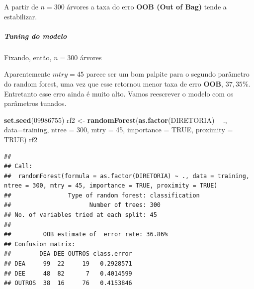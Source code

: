\documentclass[]{article}
\newenvironment{Shaded}{\begin{snugshade}}{\end{snugshade}}
\newcommand{\KeywordTok}[1]{\textcolor[rgb]{0.13,0.29,0.53}{\textbf{#1}}}
\newcommand{\DataTypeTok}[1]{\textcolor[rgb]{0.13,0.29,0.53}{#1}}
\newcommand{\DecValTok}[1]{\textcolor[rgb]{0.00,0.00,0.81}{#1}}
\newcommand{\StringTok}[1]{\textcolor[rgb]{0.31,0.60,0.02}{#1}}
\newcommand{\CommentTok}[1]{\textcolor[rgb]{0.56,0.35,0.01}{\textit{#1}}}
\newcommand{\OtherTok}[1]{\textcolor[rgb]{0.56,0.35,0.01}{#1}}
\newcommand{\OperatorTok}[1]{\textcolor[rgb]{0.81,0.36,0.00}{\textbf{#1}}}
\newcommand{\NormalTok}[1]{#1}
\let\oldsubparagraph\subparagraph
\renewcommand{\subparagraph}[1]{\oldsubparagraph{#1}\mbox{}}
\begin{document}
A partir de \(n=300\) árvores a taxa do erro \textbf{OOB (Out of Bag)}
tende a estabilizar.

\subparagraph{Tuning do modelo}\label{tuning-do-modelo}

Fixando, então, \(n=300\) árvores

Aparentemente \(mtry = 45\) parece ser um bom palpite para o segundo
parâmetro do random forest, uma vez que esse retornou menor taxa de erro
\textbf{OOB}, \(37,35\%\). Entretanto esse erro ainda é muito alto.
Vamos reescrever o modelo com os parâmetros tunados.

\begin{Shaded}
\begin{Highlighting}[]
\KeywordTok{set.seed}\NormalTok{(}\DecValTok{09986755}\NormalTok{)}
\NormalTok{rf2 <-}\StringTok{ }\KeywordTok{randomForest}\NormalTok{(}\KeywordTok{as.factor}\NormalTok{(DIRETORIA) }\OperatorTok{~}\StringTok{ }\NormalTok{., }\DataTypeTok{data=}\NormalTok{training,}
                    \DataTypeTok{ntree =} \DecValTok{300}\NormalTok{,}
                    \DataTypeTok{mtry =} \DecValTok{45}\NormalTok{,}
                    \DataTypeTok{importance =} \OtherTok{TRUE}\NormalTok{,}
                    \DataTypeTok{proximity =} \OtherTok{TRUE}\NormalTok{)}
\NormalTok{rf2}
\end{Highlighting}
\end{Shaded}

\begin{verbatim}
## 
## Call:
##  randomForest(formula = as.factor(DIRETORIA) ~ ., data = training,      ntree = 300, mtry = 45, importance = TRUE, proximity = TRUE) 
##                Type of random forest: classification
##                      Number of trees: 300
## No. of variables tried at each split: 45
## 
##         OOB estimate of  error rate: 36.86%
## Confusion matrix:
##        DEA DEE OUTROS class.error
## DEA     99  22     19   0.2928571
## DEE     48  82      7   0.4014599
## OUTROS  38  16     76   0.4153846
\end{verbatim}

\begin{Shaded}
\end{Shaded}
\end{document}
